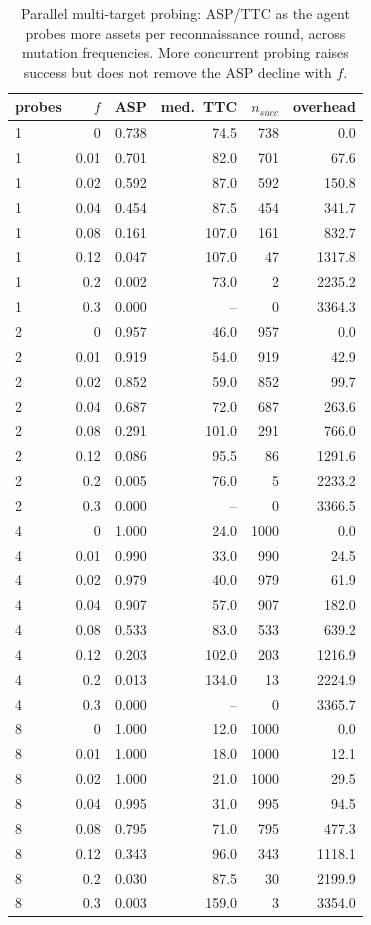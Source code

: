 \begin{table}[t]
\centering
\caption{Parallel multi-target probing: ASP/TTC as the agent probes more assets per reconnaissance round, across mutation frequencies. More concurrent probing raises success but does not remove the ASP decline with $f$.}
\label{tab:parallelism_sweep}
\begin{tabular}{lrrrrr}
\toprule
probes & $f$ & ASP & med.\ TTC & $n_{succ}$ & overhead \\
\midrule
1 & 0 & 0.738 & 74.5 & 738 & 0.0 \\
1 & 0.01 & 0.701 & 82.0 & 701 & 67.6 \\
1 & 0.02 & 0.592 & 87.0 & 592 & 150.8 \\
1 & 0.04 & 0.454 & 87.5 & 454 & 341.7 \\
1 & 0.08 & 0.161 & 107.0 & 161 & 832.7 \\
1 & 0.12 & 0.047 & 107.0 & 47 & 1317.8 \\
1 & 0.2 & 0.002 & 73.0 & 2 & 2235.2 \\
1 & 0.3 & 0.000 & -- & 0 & 3364.3 \\
2 & 0 & 0.957 & 46.0 & 957 & 0.0 \\
2 & 0.01 & 0.919 & 54.0 & 919 & 42.9 \\
2 & 0.02 & 0.852 & 59.0 & 852 & 99.7 \\
2 & 0.04 & 0.687 & 72.0 & 687 & 263.6 \\
2 & 0.08 & 0.291 & 101.0 & 291 & 766.0 \\
2 & 0.12 & 0.086 & 95.5 & 86 & 1291.6 \\
2 & 0.2 & 0.005 & 76.0 & 5 & 2233.2 \\
2 & 0.3 & 0.000 & -- & 0 & 3366.5 \\
4 & 0 & 1.000 & 24.0 & 1000 & 0.0 \\
4 & 0.01 & 0.990 & 33.0 & 990 & 24.5 \\
4 & 0.02 & 0.979 & 40.0 & 979 & 61.9 \\
4 & 0.04 & 0.907 & 57.0 & 907 & 182.0 \\
4 & 0.08 & 0.533 & 83.0 & 533 & 639.2 \\
4 & 0.12 & 0.203 & 102.0 & 203 & 1216.9 \\
4 & 0.2 & 0.013 & 134.0 & 13 & 2224.9 \\
4 & 0.3 & 0.000 & -- & 0 & 3365.7 \\
8 & 0 & 1.000 & 12.0 & 1000 & 0.0 \\
8 & 0.01 & 1.000 & 18.0 & 1000 & 12.1 \\
8 & 0.02 & 1.000 & 21.0 & 1000 & 29.5 \\
8 & 0.04 & 0.995 & 31.0 & 995 & 94.5 \\
8 & 0.08 & 0.795 & 71.0 & 795 & 477.3 \\
8 & 0.12 & 0.343 & 96.0 & 343 & 1118.1 \\
8 & 0.2 & 0.030 & 87.5 & 30 & 2199.9 \\
8 & 0.3 & 0.003 & 159.0 & 3 & 3354.0 \\
\bottomrule
\end{tabular}
\end{table}
